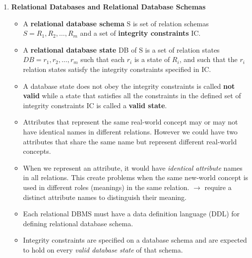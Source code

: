 \documentclass[10pt]{article}
\begin{document}
\begin{enumerate}
	\item \textbf{Relational Databases and Relational Database Schemas}
	\begin{itemize}
		\item A \textbf{relational database schema} S is set of relation schemas $S = {R_1, R_2,\ldots, R_m}$ and a set of \textbf{integrity constraints} IC.
		\item A \textbf{relational database state} DB of S is a set of relation states $DB = {r_1, r_2,\ldots, r_m}$ such that each $r_i$ is a state of $R_i$, and such that the $r_i$ relation states satisfy the integrity constraints specified in IC. 
		\item A database state does not obey the integrity constraints is called \textbf{not valid} while a state that satisfies all the constraints in the defined set of integrity constraints IC is called a \textbf{valid state}.
		\item Attributes that represent the same real-world concept may or may not have identical names in different relations. However we could have two attributes that share the same name but represent different real-world concepts.
		\item When we represent an attribute, it would have \textit{identical attribute} names in all relations. This create problems when the same new-world concept is used in different roles (meanings) in the same relation. $\rightarrow$ require a distinct attribute names to distinguish their meaning.
		\item Each relational DBMS must have a data definition language (DDL) for defining relational database schema.
		\item Integrity constraints are specified on a database schema and are expected to hold on every \textit{valid database state} of that schema. 
	\end{itemize}


\end{enumerate}
\end{document}
